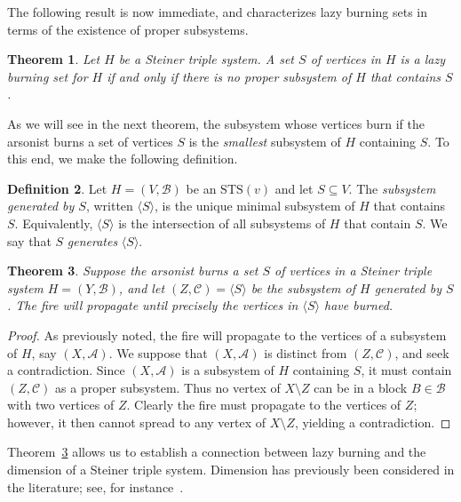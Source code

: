 \documentclass[12pt]{article}
\newtheorem{theorem}{Theorem}[section]
\theoremstyle{definition}
\newtheorem{definition}[theorem]{Definition}
\numberwithin{table}{section}
\begin{document}
The following result is now immediate, and characterizes lazy burning sets in terms of the existence of proper subsystems.  

\begin{theorem}
    Let $H$ be a Steiner triple system.  A set $S$ of vertices in $H$ is a lazy burning set for $H$ if and only if there is no proper subsystem of $H$ that contains $S$.
\end{theorem}

As we will see in the next theorem, the subsystem whose vertices burn if the arsonist burns a set of vertices $S$ is the {\em smallest} subsystem of $H$ containing $S$.  To this end, we make the following definition.
\begin{definition}
\label{def:generated subsystem}
    Let $H=(V,\mathcal{B})$ be an $\mathrm{STS}(v)$ and let $S \subseteq V$. 
    The {\em subsystem generated by $S$}, written $\langle S \rangle$,  is the unique minimal subsystem of $H$ 
    that contains $S$.  
    Equivalently, $\langle S \rangle$ is the intersection of all subsystems of $H$ that contain $S$.  
    We say that $S$ {\em generates} $\langle S \rangle$. 
\end{definition}


\begin{theorem} \label{SmallestSubsystemBurns}
Suppose the arsonist burns a set $S$ of vertices in a Steiner triple system $H=(Y,\mathcal{B})$, and let $(Z,\mathcal{C}) = \langle S \rangle$ be the subsystem of $H$ generated by $S$. The fire will propagate until precisely the vertices in $\langle S \rangle$ have burned.
\end{theorem}

\begin{proof}
    As previously noted, the fire will propagate to the vertices of a subsystem of $H$, say $(X,\mathcal{A})$.  We suppose that $(X,\mathcal{A})$ is distinct from $(Z,\mathcal{C})$, and seek a contradiction.  Since $(X,\mathcal{A})$ is a subsystem of $H$ containing $S$, it must contain $(Z,\mathcal{C})$ as a proper subsystem.  Thus no vertex of $X \setminus Z$ can be in a block $B \in \mathcal{B}$ with two vertices of $Z$.  Clearly the fire must propagate to the vertices of $Z$; however, it then cannot spread to any vertex of $X \setminus Z$, yielding a contradiction. 
\end{proof}


Theorem~\ref{SmallestSubsystemBurns} allows us to establish a connection between lazy burning and the dimension of a Steiner triple system. 
Dimension has previously been considered in the literature; see, for instance~\cite{Hilton1977, HiltonTeirlinck1980, TeirlinckThesis, Teirlinck1979, Zeitler1985, Zeitler1987}.
\end{document}

